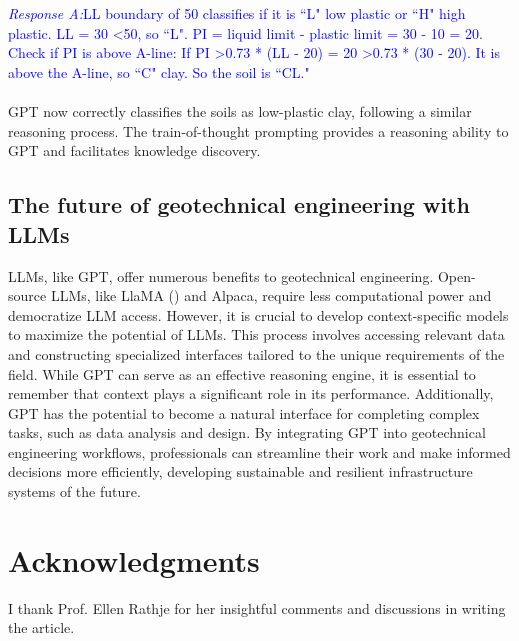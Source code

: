 \documentclass{article}
\begin{document}
\\\\
\textcolor{blue}{\textit{Response A:}LL boundary of 50 classifies if it is ``L" low plastic or ``H" high plastic. LL = 30 \textless 50, so ``L". PI = liquid limit - plastic limit = 30 - 10 = 20. Check if PI is above A-line: If PI \textgreater 0.73 * (LL - 20) = 20 \textgreater 0.73 * (30 - 20). It is above the A-line, so ``C" clay. So the soil is ``CL."}
\\\\GPT now correctly classifies the soils as low-plastic clay, following a similar reasoning process. The train-of-thought prompting provides a reasoning ability to GPT and facilitates knowledge discovery. 
\subsection{The future of geotechnical engineering with LLMs}
LLMs, like GPT, offer numerous benefits to geotechnical engineering. Open-source LLMs, like LlaMA (\cite{touvron2023llama}) and Alpaca, require less computational power and democratize LLM access. However, it is crucial to develop context-specific models to maximize the potential of LLMs. This process involves accessing relevant data and constructing specialized interfaces tailored to the unique requirements of the field. While GPT can serve as an effective reasoning engine, it is essential to remember that context plays a significant role in its performance. Additionally, GPT has the potential to become a natural interface for completing complex tasks, such as data analysis and design. By integrating GPT into geotechnical engineering workflows, professionals can streamline their work and make informed decisions more efficiently, developing sustainable and resilient infrastructure systems of the future.
\section*{Acknowledgments}
I thank Prof. Ellen Rathje for her insightful comments and discussions in writing the article. 
\clearpage
\printbibliography
\end{document}
